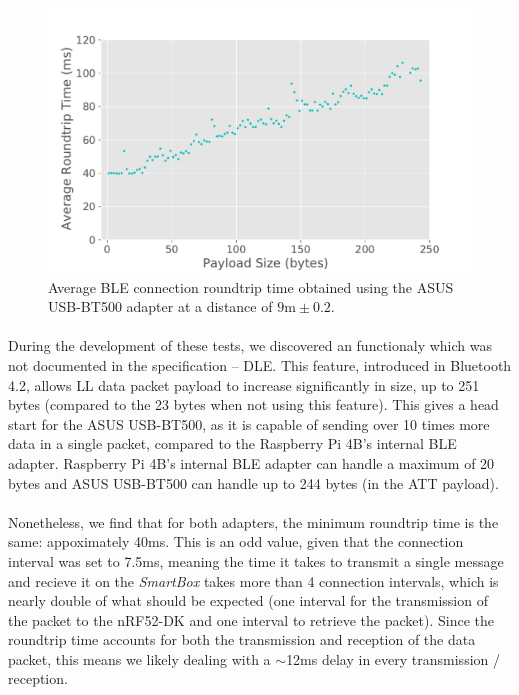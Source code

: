 \begin{figure}[H]
    \centering
    \includegraphics[width=0.75\linewidth]{images/ble-roundtrip-hci0-900cm.pdf}
    \caption[Average \acs{BLE} connection roundtrip time obtained using the ASUS USB-BT500 adapter at a distance of 9m.]{Average \acs{BLE} connection roundtrip time obtained using the ASUS USB-BT500 adapter at a distance of $9\text{m} \pm 0.2$.}
    \label{fig:ble-roundtrip-hci0-9m}
\end{figure}

\paragraph{} During the development of these tests, we discovered an functionaly which was not documented in the specification -- \acf{DLE}. This feature, introduced in Bluetooth 4.2, allows \acs{LL} data packet payload to increase significantly in size, up to 251 bytes (compared to the 23 bytes when not using this feature). This gives a head start for the ASUS USB-BT500, as it is capable of sending over 10 times more data in a single packet, compared to the Raspberry Pi 4B's internal \acs{BLE} adapter. Raspberry Pi 4B's internal \acs{BLE} adapter can handle a maximum of 20 bytes and ASUS USB-BT500 can handle up to 244 bytes (in the \acs{ATT} payload).

\paragraph{} Nonetheless, we find that for both adapters, the minimum roundtrip time is the same: appoximately 40ms. This is an odd value, given that the connection interval was set to 7.5ms, meaning the time it takes to transmit a single message and recieve it on the \textit{SmartBox} takes more than 4 connection intervals, which is nearly double of what should be expected (one interval for the transmission of the packet to the nRF52-DK and one interval to retrieve the packet). Since the roundtrip time accounts for both the transmission and reception of the data packet, this means we likely dealing with a $\sim$12ms delay in every transmission / reception.

